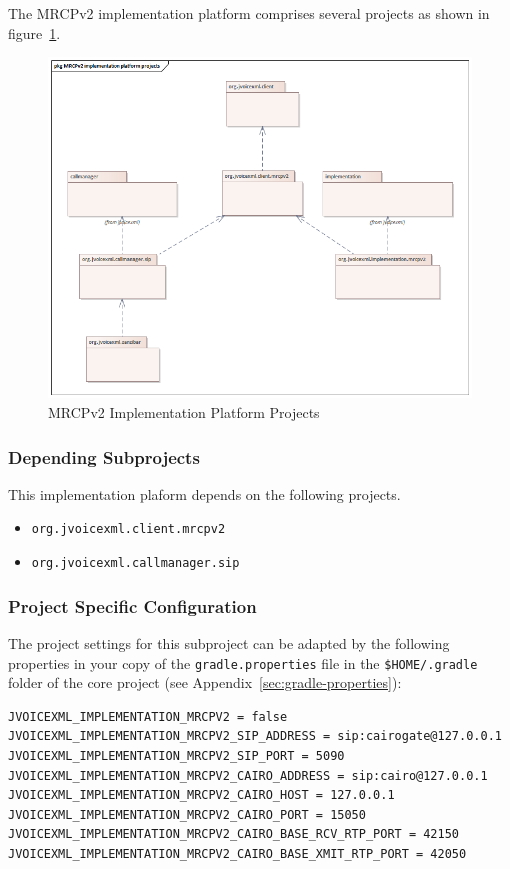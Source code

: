 \documentclass[11pt,a4paper]{article}
\begin{document}
The MRCPv2 implementation platform comprises several projects as shown in figure~\ref{fig:MRCPv2-implementation-platform-projects}.
\begin{figure}
\includegraphics[width=\linewidth]{MRCPv2-implementation-platform-projects.png}
\caption{MRCPv2 Implementation Platform Projects}
\label{fig:MRCPv2-implementation-platform-projects}
\end{figure}

\subsubsection{Depending Subprojects}

This implementation plaform depends on the following projects.
\begin{itemize}
\item \texttt{org.jvoicexml.client.mrcpv2}
\item \texttt{org.jvoicexml.callmanager.sip}
\end{itemize}

\subsubsection{Project Specific Configuration}

The project settings for this subproject can be adapted by the following
properties in your copy of the \texttt{gradle.properties} file in the
\texttt{\${HOME}/.gradle} folder of the core project (see 
Appendix~\ref{sec:gradle-properties}):
\begin{lstlisting}
JVOICEXML_IMPLEMENTATION_MRCPV2 = false
JVOICEXML_IMPLEMENTATION_MRCPV2_SIP_ADDRESS = sip:cairogate@127.0.0.1
JVOICEXML_IMPLEMENTATION_MRCPV2_SIP_PORT = 5090
JVOICEXML_IMPLEMENTATION_MRCPV2_CAIRO_ADDRESS = sip:cairo@127.0.0.1
JVOICEXML_IMPLEMENTATION_MRCPV2_CAIRO_HOST = 127.0.0.1
JVOICEXML_IMPLEMENTATION_MRCPV2_CAIRO_PORT = 15050
JVOICEXML_IMPLEMENTATION_MRCPV2_CAIRO_BASE_RCV_RTP_PORT = 42150
JVOICEXML_IMPLEMENTATION_MRCPV2_CAIRO_BASE_XMIT_RTP_PORT = 42050
\end{lstlisting}
\end{document}
